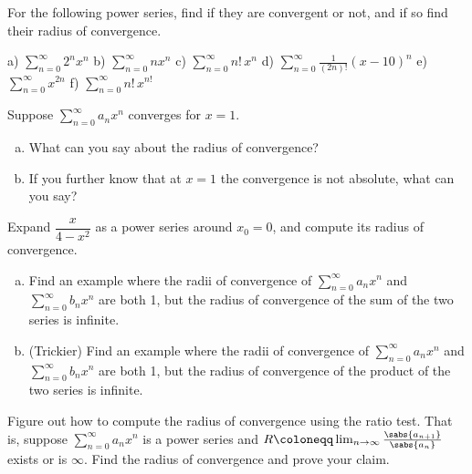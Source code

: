 \begin{exercise}
For the following power series, find if they are convergent or not, and
if so find their radius of convergence.

\medskip

\noindent
a)
$\displaystyle \sum_{n=0}^\infty 2^n x^n$
\qquad
b) $\displaystyle \sum_{n=0}^\infty n x^n$
\qquad 
c) 
$\displaystyle \sum_{n=0}^\infty n! \, x^n$
\qquad
d) $\displaystyle \sum_{n=0}^\infty \frac{1}{(2n)!} {(x-10)}^n$
\qquad
e) $\displaystyle \sum_{n=0}^\infty x^{2n}$
\qquad
f) $\displaystyle \sum_{n=0}^\infty n! \, x^{n!}$
\end{exercise}

\begin{exercise}
Suppose $\sum_{n=0}^\infty a_n x^n$ converges for $x=1$.
\begin{enumerate}[a)]
\item
What can you say about the radius of convergence?
\item
If you further know that at $x=1$ the convergence is not absolute,
what can you say?
\end{enumerate}
\end{exercise}

\begin{exercise}
Expand
$\dfrac{x}{4-x^2}$ as a power series around $x_0 = 0$,
and compute its radius of convergence.
\end{exercise}

\begin{exercise}
\leavevmode
\begin{enumerate}[a)]
\item
Find an example where the radii of convergence of $\sum_{n=0}^\infty a_n x^n$ and
$\sum_{n=0}^\infty b_n x^n$ are both 1, but the radius of convergence of
the sum of the two series is infinite.
\item
(Trickier)
Find an example where the radii of convergence of $\sum_{n=0}^\infty a_n x^n$ and
$\sum_{n=0}^\infty b_n x^n$ are both 1, but the radius of convergence of
the product of the two series is infinite.
\end{enumerate}
\end{exercise}

\begin{exercise}
Figure out how to compute the radius of convergence using the ratio test.
That is, suppose $\sum_{n=0}^\infty a_n x^n$ is a power series and
$R \coloneqq \lim_{n\to\infty} \frac{\sabs{a_{n+1}}}{\sabs{a_n}}$ exists or is $\infty$.
Find the radius of convergence and prove your claim.
\end{exercise}

